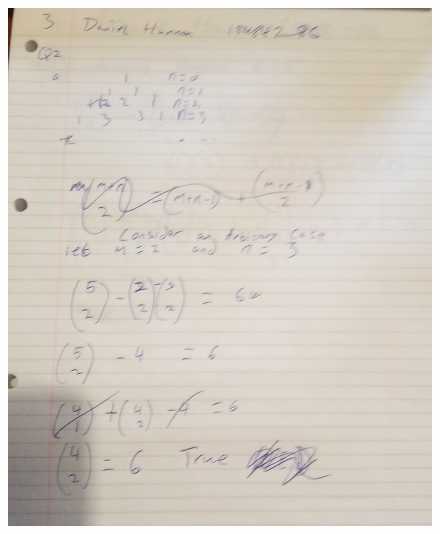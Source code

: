 \documentclass{article}
\begin{document}
	\newpage
	\begin{figure}
		\centering
		\includegraphics[width=\textwidth]{IMG_20210118_111906.jpg}
	\end{figure}
	\newpage
\end{document}

